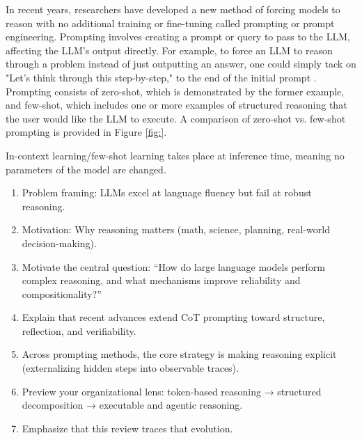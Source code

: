 \documentclass[project]{bsu-cs}  %
\begin{document}
In recent years, researchers have developed a new method of forcing models to reason with no additional training or fine-tuning called prompting or prompt engineering. Prompting involves creating a prompt or query to pass to the LLM, affecting the LLM's output directly. For example, to force an LLM to reason through a problem instead of just outputting an answer, one could simply tack on "Let's think through this step-by-step," to the end of the initial prompt \citep{kojima2023largelanguagemodelszeroshot}. Prompting consists of zero-shot, which is demonstrated by the former example, and few-shot, which includes one or more examples of structured reasoning that the user would like the LLM to execute. A comparison of zero-shot vs. few-shot prompting is provided in Figure \ref{fig:}.

In-context learning/few-shot learning takes place at inference time, meaning no parameters of the model are changed.
% 
\begin{enumerate}
    \item Problem framing: LLMs excel at language fluency but fail at robust reasoning.
    
    \item Motivation: Why reasoning matters (math, science, planning, real-world decision-making).
    
    \item Motivate the central question: “How do large language models perform complex reasoning, and what mechanisms improve reliability and compositionality?”

    \item Explain that recent advances extend CoT prompting toward structure, reflection, and verifiability.

    \item Across prompting methods, the core strategy is making reasoning explicit (externalizing hidden steps into observable traces).

    \item Preview your organizational lens: token-based reasoning → structured decomposition → executable and agentic reasoning.

    \item Emphasize that this review traces that evolution.
\end{enumerate}
% 
\end{document}
